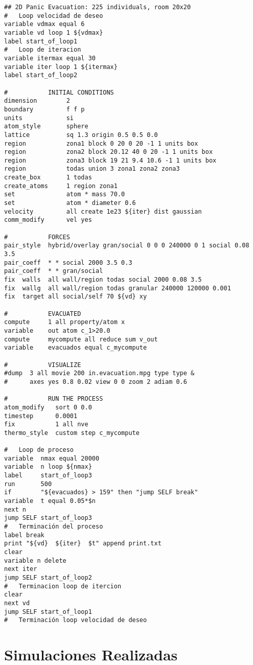 \begin{verbatim}
## 2D Panic Evacuation: 225 individuals, room 20x20
#	Loop velocidad de deseo
variable vdmax equal 6
variable vd loop 1 ${vdmax}
label start_of_loop1
#	Loop de iteracion
variable itermax equal 30
variable iter loop 1 ${itermax}
label start_of_loop2

#           INITIAL CONDITIONS
dimension        2
boundary         f f p
units            si
atom_style       sphere
lattice          sq 1.3 origin 0.5 0.5 0.0
region           zona1 block 0 20 0 20 -1 1 units box
region           zona2 block 20.12 40 0 20 -1 1 units box
region           zona3 block 19 21 9.4 10.6 -1 1 units box
region           todas union 3 zona1 zona2 zona3
create_box       1 todas
create_atoms     1 region zona1
set              atom * mass 70.0
set              atom * diameter 0.6
velocity         all create 1e23 ${iter} dist gaussian
comm_modify      vel yes

#           FORCES
pair_style  hybrid/overlay gran/social 0 0 0 240000 0 1 social 0.08 3.5
pair_coeff  * * social 2000 3.5 0.3
pair_coeff  * * gran/social
fix  walls  all wall/region todas social 2000 0.08 3.5
fix  wallg  all wall/region todas granular 240000 120000 0.001    
fix  target all social/self 70 ${vd} xy          

#           EVACUATED
compute     1 all property/atom x
variable    out atom c_1>20.0
compute     mycompute all reduce sum v_out
variable    evacuados equal c_mycompute

#           VISUALIZE
#dump  3 all movie 200 in.evacuation.mpg type type &
#      axes yes 0.8 0.02 view 0 0 zoom 2 adiam 0.6

#           RUN THE PROCESS
atom_modify   sort 0 0.0
timestep      0.0001
fix           1 all nve
thermo_style  custom step c_mycompute

#	Loop de proceso
variable  nmax equal 20000
variable  n loop ${nmax}
label     start_of_loop3
run       500
if        "${evacuados} > 159" then "jump SELF break"
variable  t equal 0.05*$n
next n
jump SELF start_of_loop3
#	Terminación del proceso
label break
print "${vd}  ${iter}  $t" append print.txt
clear
variable n delete
next iter
jump SELF start_of_loop2
#	Terminacion loop de itercion
clear
next vd
jump SELF start_of_loop1
#	Terminación loop velocidad de deseo
\end{verbatim}

\section{Simulaciones Realizadas}

